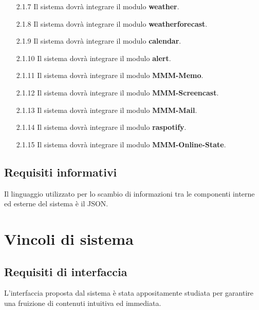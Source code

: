 \documentclass[a4paper,11pt]{article}       %
\begin{document}
\begin{itemize}
            \item[2.1.7] Il sistema dovrà integrare il modulo \textbf{weather}.
            \item[2.1.8] Il sistema dovrà integrare il modulo \textbf{weatherforecast}.
            \item[2.1.9] Il sistema dovrà integrare il modulo \textbf{calendar}.
            \item[2.1.10] Il sistema dovrà integrare il modulo \textbf{alert}.
            \item[2.1.11] Il sistema dovrà integrare il modulo \textbf{MMM-Memo}.
            \item[2.1.12] Il sistema dovrà integrare il modulo \textbf{MMM-Screencast}.
            \item[2.1.13] Il sistema dovrà integrare il modulo \textbf{MMM-Mail}.
            \item[2.1.14] Il sistema dovrà integrare il modulo \textbf{raspotify}.
            \item[2.1.15] Il sistema dovrà integrare il modulo \textbf{MMM-Online-State}.
        \end{itemize}
        
    \subsection{Requisiti informativi}
        Il linguaggio utilizzato per lo scambio di informazioni tra le componenti interne ed esterne del sistema è il JSON.

\newpage

\section{Vincoli di sistema}
    
    \subsection{Requisiti di interfaccia}
        L'interfaccia proposta dal sistema è stata appositamente studiata per garantire una fruizione di contenuti intuitiva ed immediata.
        
\end{document}
